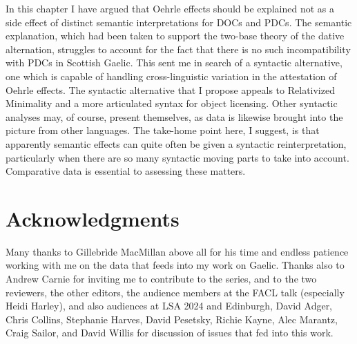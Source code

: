 \documentclass[output=paper,colorlinks,citecolor=brown]{langscibook}
\begin{document}
In this chapter I have argued that Oehrle effects should be explained not as a side effect of distinct semantic interpretations for DOCs and PDCs. The semantic explanation, which had been taken to support the two-base theory of the dative alternation, struggles to account for the fact that there is no such incompatibility with PDCs in Scottish Gaelic. This sent me in search of a syntactic alternative, one which is capable of handling cross-linguistic variation in the attestation of Oehrle effects. The syntactic alternative that I propose appeals to Relativized Minimality and a more articulated syntax for object licensing. Other syntactic analyses may, of course, present themselves, as data is likewise brought into the picture from other languages. The take-home point here, I suggest, is that apparently semantic effects can quite often be given a syntactic reinterpretation, particularly when there are so many syntactic moving parts to take into account. Comparative data is essential to assessing these matters. 


\section*{Acknowledgments}

Many thanks to Gillebr\`ide MacMillan above all for his time and endless patience working with me on the data that feeds into my work on Gaelic. Thanks also to Andrew Carnie for inviting me to contribute to the series, and to the two reviewers, the other editors, the audience members at the FACL talk (especially Heidi Harley), and also audiences at LSA 2024 and Edinburgh, David Adger, Chris Collins, Stephanie Harves, David Pesetsky, Richie Kayne, Alec Marantz, Craig Sailor, and David Willis for discussion of issues that fed into this work. 


\printbibliography[heading=subbibliography,notkeyword=this]
\end{document}
